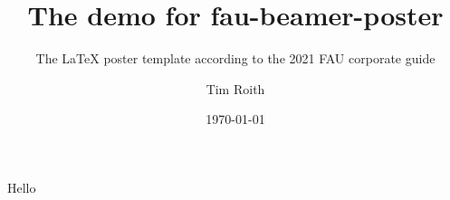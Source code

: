 \documentclass[final, 12pt]{beamer}
\title[fau-beamer]{The demo for fau-beamer-poster}
\subtitle{The \LaTeX{} poster template according to the 2021 FAU
corporate guide}
\author[T. Roith]{Tim Roith}
\institute[FAU]{Friedrich-Alexander Universität Erlangen-Nürnberg,
Department Mathematik}
\date{\today}
\begin{document}
\begin{frame}{Hello}{}
\end{frame}
\end{document}
